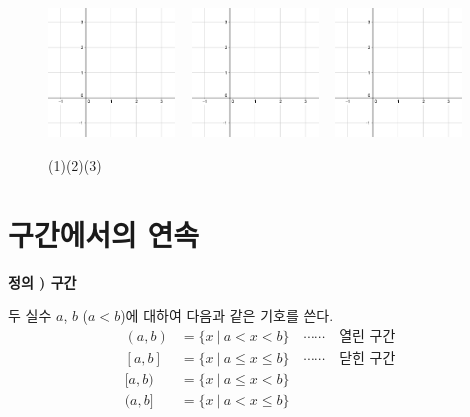 \documentclass{oblivoir}
\newcounter{num}
\newcommand\defi[1]
{\bigskip\par\noindent\stepcounter{num} \textbf{정의 \thenum) #1}\par\noindent}
\newcommand\ba{\ensuremath{\:|\:}}
\let\oldsection\section
\renewcommand\section{\clearpage\oldsection}
\let\emph\textsf
\begin{document}
\begin{figure}[h!]
\centering
\noindent\includegraphics[width=0.3\textwidth]{-1_3}
~
\noindent\includegraphics[width=0.3\textwidth]{-1_3}
~
\noindent\includegraphics[width=0.3\textwidth]{-1_3}

\noindent
(1)\qquad\qquad\qquad\qquad\qquad(2)\qquad\qquad\qquad\qquad\qquad\qquad(3)
\end{figure}

\section{구간에서의 연속}
\begin{mdframed}
%
\defi{구간}
두 실수 \(a\), \(b\) (\(a<b\))에 대하여 다음과 같은 기호를 쓴다.
\begin{align*}
(a,b)&=\{x\ba a<x<b\}		\quad\cdots\cdots\quad\emph{열린 구간}\\
[a,b]&=\{x\ba a\le x\le b\}	\quad\cdots\cdots\quad\emph{닫힌 구간}\\
[a,b)&=\{x\ba a\le x<b\}\\
(a,b]&=\{x\ba a<x\le b\}
\end{align*}
\end{mdframed}
\bigskip
\end{document}
